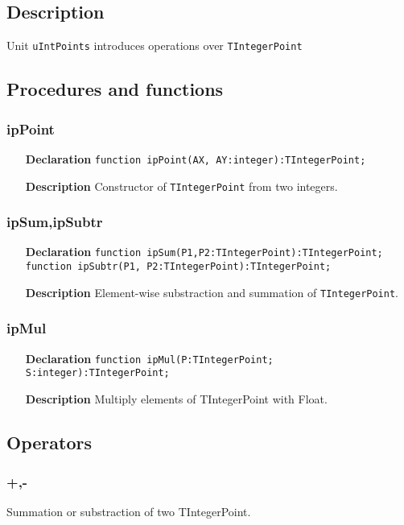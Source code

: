 \documentclass[12pt,a4paper,oneside]{report}
\newcommand{\declarationitem}[1]{\textbf{#1}}
\newcommand{\descriptiontitle}[1]{\textbf{#1}}
\newcommand{\code}[1]{\texttt{#1}}
\begin{document}
\subsection{Description}
Unit \code{uIntPoints} introduces operations over \code{TIntegerPoint}
\subsection{Procedures and functions}
\subsubsection{ipPoint}
\label{ipPoint}
\begin{itemize}
	\item[\declarationitem{Declaration}\hfill]
	\code{function ipPoint(AX, AY:integer):TIntegerPoint;}
	\item[\descriptiontitle{Description}]Constructor of \code{TIntegerPoint} from two integers.
\end{itemize}
\subsubsection{ipSum,ipSubtr}
\label{ipSubtr}
\begin{itemize}
	\item[\declarationitem{Declaration}\hfill]
	\code{function ipSum(P1,P2:TIntegerPoint):TIntegerPoint;\\
		function ipSubtr(P1, P2:TIntegerPoint):TIntegerPoint;}
	\item[\descriptiontitle{Description}]Element-wise substraction and summation of \code{TIntegerPoint}.
\end{itemize}
\subsubsection{ipMul}
\label{ipMul}
\begin{itemize}
	\item[\declarationitem{Declaration}\hfill]
	\code{function ipMul(P:TIntegerPoint; S:integer):TIntegerPoint;}
	\item[\descriptiontitle{Description}]Multiply elements of TIntegerPoint with Float.
\end{itemize}
\subsection{Operators}
\subsubsection{+,-}
Summation or substraction of two TIntegerPoint.
\end{document}
